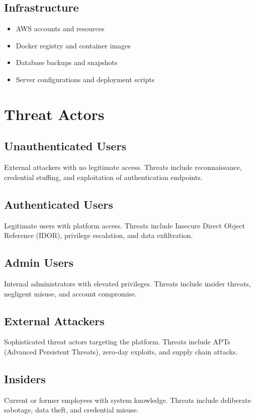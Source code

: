 \documentclass{report}
\begin{document}
\subsection{Infrastructure}
\begin{itemize}
\item AWS accounts and resources
\item Docker registry and container images
\item Database backups and snapshots
\item Server configurations and deployment scripts
\end{itemize}

\section{Threat Actors}

\subsection{Unauthenticated Users}
External attackers with no legitimate access. Threats include reconnaissance, credential stuffing, and exploitation of authentication endpoints.

\subsection{Authenticated Users}
Legitimate users with platform access. Threats include Insecure Direct Object Reference (IDOR), privilege escalation, and data exfiltration.

\subsection{Admin Users}
Internal administrators with elevated privileges. Threats include insider threats, negligent misuse, and account compromise.

\subsection{External Attackers}
Sophisticated threat actors targeting the platform. Threats include APTs (Advanced Persistent Threats), zero-day exploits, and supply chain attacks.

\subsection{Insiders}
Current or former employees with system knowledge. Threats include deliberate sabotage, data theft, and credential misuse.
\end{document}
